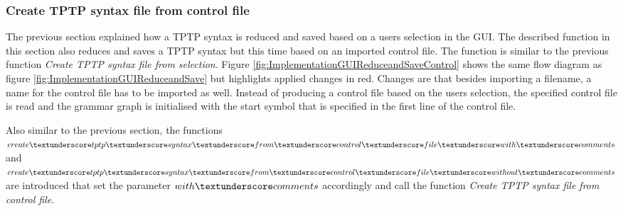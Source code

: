 \subsubsection{Create \ac{TPTP} syntax file from control file}\label{sec:ImplementationGUICreateTPTPFromControlfile}

The previous section explained how a \ac{TPTP} syntax is reduced and saved based on a users selection in the GUI. The described function in this section also reduces and saves a \ac{TPTP} syntax but this time based on an imported control file. The function is similar to the previous function \textit{Create \ac{TPTP} syntax file from selection}. Figure \ref{fig:ImplementationGUIReduceandSaveControl} shows the same flow diagram as figure \ref{fig:ImplementationGUIReduceandSave} but highlights applied changes in red. Changes are that besides importing a filename, a name for the control file has to be imported as well. Instead of producing a control file based on the users selection, the specified control  file is read and the grammar graph is initialised with the start symbol that is specified in the first line of the control file.

Also similar to the previous section, the functions \\ $create\textunderscore tptp\textunderscore syntax\textunderscore from\textunderscore control\textunderscore file\textunderscore with\textunderscore comments$ and \\
$create\textunderscore tptp\textunderscore syntax\textunderscore from\textunderscore control\textunderscore file\textunderscore without\textunderscore comments$ are introduced that set the parameter $with\textunderscore comments$ accordingly and call the function \textit{Create \ac{TPTP} syntax file from control file}.

